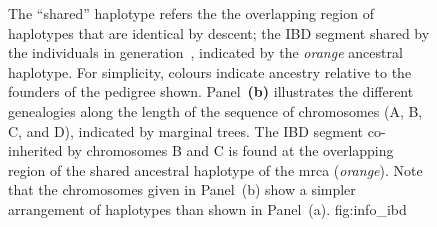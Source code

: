 \begin{figure}[p]
{The ``shared'' haplotype refers the the overlapping region of haplotypes that are identical by descent; \ie the IBD segment shared by the  individuals in generation~, indicated by the \emph{orange} ancestral haplotype.
For simplicity, colours indicate ancestry relative to the founders of the pedigree shown.
Panel~\textbf{(b)} illustrates the different genealogies along the length of the sequence of  chromosomes (A, B, C, and D), indicated by  marginal trees.
The IBD segment co-inherited by chromosomes B and C is found at the overlapping region of the shared ancestral haplotype of the \gls{mrca} (\emph{orange}).
Note that the  chromosomes given in Panel~(b) show a simpler arrangement of haplotypes than shown in Panel~(a).}
{fig:info_ibd}
\end{figure}

